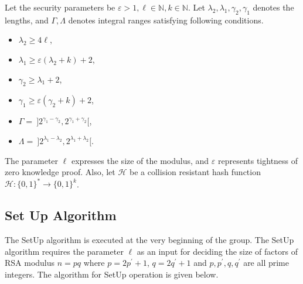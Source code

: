 Let the security parameters be $\varepsilon > 1, \ell \in \mathbb{N}, k \in \mathbb{N}$. Let $\lambda_2, \lambda_1, \gamma_2, \gamma_1$ denotes the lengths, and $\Gamma, \Lambda$ denotes integral ranges satisfying following conditions.

\begin{center}
\begin{tcolorbox}[width= 7cm, height= 7cm, valign = center]
\begin{itemize}
\item $\lambda_2 \geq 4\ell$,
\item $\lambda_1 \geq \varepsilon(\lambda_2 + k) + 2$,
\item $\gamma_2 \geq \lambda_1 + 2$, 
\item $\gamma_1 \geq \varepsilon(\gamma_2 + k)+ 2$,
\item $\Gamma =~]2^{\gamma_1-\gamma_2}, 2^{\gamma_1+\gamma_2}[$,
\item $\Lambda =~]2^{\lambda_1-\lambda_2}, 2^{\lambda_1+\lambda_2}[$.
\end{itemize}
\end{tcolorbox}
\end{center}
The parameter $\ell$ expresses the size of the modulus, and $\varepsilon$ represents tightness of zero knowledge proof. Also, let $\mathcal{H}$ be a collision resistant hash function $\mathcal{H}: \{0, 1\}^* \rightarrow \{0, 1\}^k$.

\subsection{Set Up Algorithm}
The SetUp algorithm is executed at the very beginning of the group. The SetUp algorithm requires the parameter $\ell$ as an input for deciding the size of factors of RSA modulus $n = pq$ where $p = 2 p^\prime + 1$, $q = 2 q^\prime + 1$ and $p, p^\prime, q, q^\prime$ are all prime integers. The algorithm for SetUp operation is given below.

